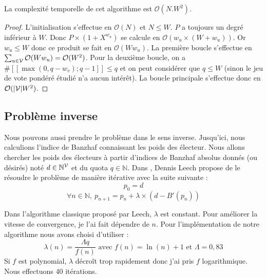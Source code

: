 \begin{proposition}
	La complexité temporelle de cet algorithme est $\mathcal{O}(N . W^2)$.
\end{proposition}

\begin{proof}
	L'initialisation s'effectue en $\mathcal{O}(N)$ et $N \leqslant W$.
	$P$ a toujours un degré inférieur à $W$. Donc $P \times (1 + X^{w_u})$ se calcule en $\mathcal{O}(w_u \times (W + w_u))$.
	Or $w_u \leqslant W$ donc ce produit se fait en $\mathcal{O}(W w_u)$.
	La première boucle s'effectue en $\sum_{u \in \mathcal{V}} \mathcal{O}(W w_u) = \mathcal{O}(W^2)$.
	Pour la deuxième boucle, on a $\# [\![\max(0,q-w_v);q-1]\!] \leqslant q$ et on peut considérer que $q \leqslant W$ (sinon le jeu de vote pondéré étudié n'a aucun intérêt).
	La boucle principale s'effectue donc en $\mathcal{O}(|\mathcal{V}| W^2)$.
\end{proof}


\subsection{Problème inverse}

Nous pouvons aussi prendre le problème dans le sens inverse.
Jusqu'ici, nous calculions l'indice de Banzhaf connaissant les poids des électeur. Nous allons chercher les poids des électeurs à partir d'indices de Banzhaf absolus donnés (ou désirés) noté $d \in \mathbb{N}^{\mathcal{V}}$ et du quota $q \in \mathbb{N}$.
Dans \cite{algorithm_weight}, Dennis Leech propose de le résoudre le problème de manière itérative avec la suite suivante :
\begin{equation*}
	p_0 = d
\end{equation*}
\begin{equation*}
	\forall n \in \mathbb{N}, \
	p_{n+1} = p_n + \lambda \times \left( d - B'(p_n) \right)
\end{equation*}

Dans l'algorithme classique proposé par Leech, $\lambda$ est constant. Pour améliorer la vitesse de convergence, je l'ai fait dépendre de $n$.
Pour l'implémentation de notre algorithme nous avons choisi d'utiliser :
\begin{equation*}
	\lambda(n) = \frac{\Lambda q}{f(n)}
	\text{ avec } f(n) = \ln(n) + 1
	\text{ et } \Lambda = 0,\!83
\end{equation*}
Si $f$ est polynomial, $\lambda$ décroît trop rapidement donc j'ai pris $f$ logarithmique.
Nous effectuons 40 itérations.
